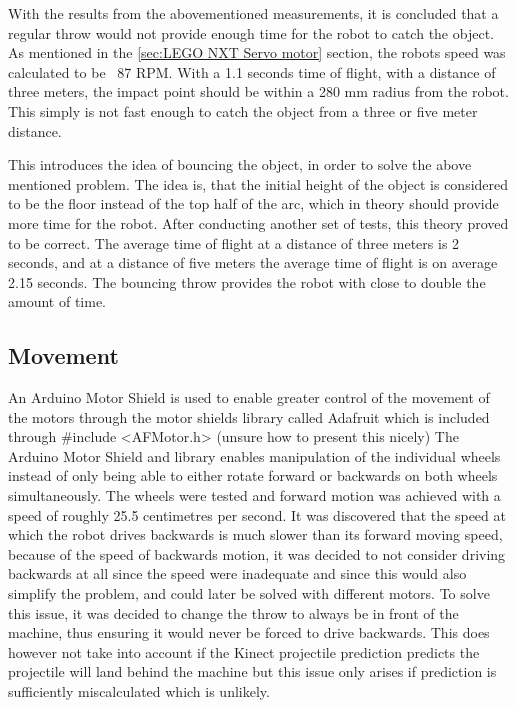 With the results from the abovementioned measurements, it is concluded that a regular throw would not provide enough time for the robot to catch the object. As mentioned in the \ref{sec:LEGO NXT Servo motor} section, the robots speed was calculated to be ~87 RPM. With a 1.1 seconds time of flight, with a distance of three meters, the impact point should be within a 280 mm radius from the robot. This simply is not fast enough to catch the object from a three or five meter distance.

This introduces the idea of bouncing the object, in order to solve the above mentioned problem. The idea is, that the initial height of the object is considered to be the floor instead of the top half of the arc, which in theory should provide more time for the robot. \newline
After conducting another set of tests, this theory proved to be correct. The average time of flight at a distance of three meters is 2 seconds, and at a distance of five meters the average time of flight is on average 2.15 seconds. The bouncing throw provides the robot with close to double the amount of time.

\subsection{Movement}
\label{sec:i1MovementImplementation}
An Arduino Motor Shield is used to enable greater control of the movement of the motors through the motor shields library called Adafruit which is included through \#include <AFMotor.h> (unsure how to present this nicely)
The Arduino Motor Shield and library enables manipulation of the individual wheels instead of only being able to either rotate forward or backwards on both wheels simultaneously. 
The wheels were tested and forward motion was achieved with a speed of roughly 25.5 centimetres per second. It was discovered that the speed at which the robot drives backwards is much slower than its forward moving speed, because of the speed of backwards motion, it was decided to not consider driving backwards at all since the speed were inadequate and since this would also simplify the problem, and could later be solved with different motors. To solve this issue, it was decided to change the throw to always be in front of the machine, thus ensuring it would never be forced to drive backwards. This does however not take into account if the Kinect projectile prediction predicts the projectile will land behind the machine but this issue only arises if prediction is sufficiently miscalculated which is unlikely.

